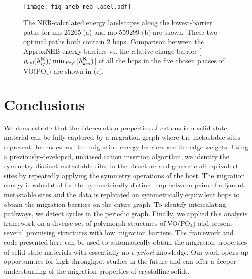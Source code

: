 \documentclass[reprint,preprintnumbers,amsmath,amssymb,aps,prl]{revtex4-1}
\begin{document}
%
\begin{figure}[htb]
    \centering
    \texttt{[image: fig\_aneb\_neb\_label.pdf]}
    \caption{
        \label{fig:aneb} 
        The NEB-calculated energy landscapes along the lowest-barrier paths for mp-25265 (a) and mp-559299 (b) are shown. 
        These two optimal paths both contain 2 hops. Comparison between the ApproxNEB energy barriers vs. the relative charge barrier [$\displaystyle \rho_{\rm cyl}(h_{ij}^{\mathbf{K}})/\min\rho_{\rm cyl}(h_{mn}^{\mathbf{K}})$] of all the hops in the five chosen phases of VO(PO$_4$) are shown in (c).
    }
\end{figure}{}

\section{Conclusions}

We demonstrate that the intercalation properties of cations in a solid-state material can be fully captured by a migration graph where the metastable sites represent the nodes and the migration energy barriers are the edge weights.
Using a previously-developed, unbiased cation insertion algorithm, we identify the symmetry-distinct metastable sites in the structure and generate all equivalent sites by repeatedly applying the symmetry operations of the host.
The migration energy is  calculated for the symmetrically-distinct hop between pairs of adjacent metastable sites and the data is replicated on symmetrically equivalent hops to obtain the migration barriers on the entire graph. To identify intercalating pathways, we detect cycles in the periodic graph. Finally, we applied this analysis framework on a diverse set of polymorph structures of VO(PO$_4$) and present several promising structures with low migration barriers.
The framework and code presented here can be used to automatically obtain the migration properties of solid-state materials with essentially no {\it a priori} knowledge. 
Our work opens up opportunities for high throughput studies in the future and can offer a deeper understanding of the migration properties of crystalline solids.










\end{document}
